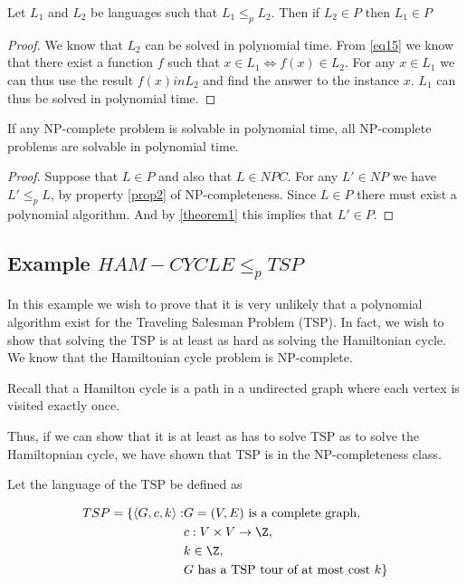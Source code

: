 \documentclass[10pt]{article}
\begin{document}
\begin{theorem}
Let $L_1$ and $L_2$ be languages such that $L_1 \leq_p L_2$. Then if $L_2 \in P$ then $L_1 \in P$  
\label{theorem1}
\end{theorem}

\begin{proof}
We know that $L_2$ can be solved in polynomial time. From \ref{eq15} we know that there exist a function $f$ such that $x \in L_1 \Leftrightarrow f(x) \in L_2$. For any $x \in L_1$ we can thus use the result $f(x) in L_2$ and find the answer to the instance $x$. $L_1$ can thus be solved in polynomial time.  
\end{proof}

\begin{theorem}
If any NP-complete problem is solvable in polynomial time, all NP-complete problems are solvable in polynomial time.
\end{theorem}

\begin{proof}
  Suppose that $L \in P$ and also that $L \in NPC$. For any $L' \in NP$ we have $L' \leq_p L$, by property \ref{prop2} of NP-completeness. Since $L \in P$ there must exist a polynomial algorithm. And by \ref{theorem1} this implies that $L' \in P$.
\end{proof}



\subsection{Example $HAM-CYCLE \leq_p TSP$} %
\label{sub:subsection_name}
In this example we wish to prove that it is very unlikely that a polynomial algorithm exist for the Traveling Salesman Problem (TSP). In fact, we wish to show that solving the TSP is at least as hard as solving the Hamiltonian cycle. We know that the Hamiltonian cycle problem is NP-complete. 

Recall that a Hamilton cycle is a path in a undirected graph where each vertex is visited exactly once.

Thus, if we can show that it is at least as has to solve TSP as to solve the Hamiltopnian cycle, we have shown that TSP is in the NP-completeness class. 

Let the language of the TSP be defined as

\begin{align*}
TSP = \{\langle G, c, k \rangle : & G = (V,E) \text{ is a complete graph}, \\ 
                                  & c:V \times V \rightarrow \Z, \\
                                  & k \in \Z, \\
                                  & \text{$G$ has a TSP tour of at most cost $k$}\}
\end{align*}
\end{document}
